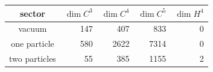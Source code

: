 \begin{tabular}{c|rrr|r}
sector & $\dim C^3$ & $\dim C^4$ & $\dim C^5$ & $\dim H^4$ \\
\hline
vacuum & 147 & 407 & 833 & 0 \\
one particle & 580 & 2622 & 7314 & 0 \\
two particles & 55 & 385 & 1155 & 2 \\
\end{tabular}
